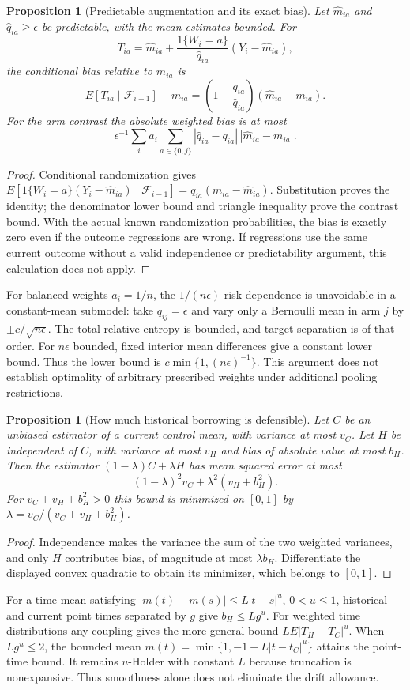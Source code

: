 \documentclass[11pt]{article}
\newtheorem{proposition}[theorem]{Proposition}
\theoremstyle{remark}
\begin{document}
\begin{proposition}[Predictable augmentation and its exact bias]
Let $\widehat m_{ia}$ and $\widehat q_{ia}\ge\epsilon$ be predictable, with the mean estimates bounded. For
\[
 T_{ia}=\widehat m_{ia}+\frac{1\{W_i=a\}}{\widehat q_{ia}}
 (Y_i-\widehat m_{ia}),
\]
the conditional bias relative to $m_{ia}$ is
\[
 E[T_{ia}\mid\mathcal F_{i-1}]-m_{ia}
 =\left(1-\frac{q_{ia}}{\widehat q_{ia}}\right)(\widehat m_{ia}-m_{ia}).
\]
For the arm contrast the absolute weighted bias is at most
\[
 \epsilon^{-1}\sum_i a_i\sum_{a\in\{0,j\}}
 |\widehat q_{ia}-q_{ia}|\,|\widehat m_{ia}-m_{ia}|.
\]
\end{proposition}
\begin{proof}
Conditional randomization gives
$E[1\{W_i=a\}(Y_i-\widehat m_{ia})\mid\mathcal F_{i-1}]
=q_{ia}(m_{ia}-\widehat m_{ia})$. Substitution proves the identity; the denominator lower bound and triangle inequality prove the contrast bound. With the actual known randomization probabilities, the bias is exactly zero even if the outcome regressions are wrong. If regressions use the same current outcome without a valid independence or predictability argument, this calculation does not apply.
\end{proof}
For balanced weights $a_i=1/n$, the $1/(n\epsilon)$ risk dependence is unavoidable in a constant-mean submodel: take $q_{ij}=\epsilon$ and vary only a Bernoulli mean in arm $j$ by $\pm c/\sqrt{n\epsilon}$. The total relative entropy is bounded, and target separation is of that order. For $n\epsilon$ bounded, fixed interior mean differences give a constant lower bound. Thus the lower bound is $c\min\{1,(n\epsilon)^{-1}\}$. This argument does not establish optimality of arbitrary prescribed weights under additional pooling restrictions.

\begin{proposition}[How much historical borrowing is defensible]
Let $C$ be an unbiased estimator of a current control mean, with variance at most $v_C$. Let $H$ be independent of $C$, with variance at most $v_H$ and bias of absolute value at most $b_H$. Then the estimator $(1-\lambda)C+\lambda H$ has mean squared error at most
\[
 (1-\lambda)^2v_C+\lambda^2(v_H+b_H^2).
\]
For $v_C+v_H+b_H^2>0$ this bound is minimized on $[0,1]$ by
$\lambda=v_C/(v_C+v_H+b_H^2)$.
\end{proposition}
\begin{proof}
Independence makes the variance the sum of the two weighted variances, and only $H$ contributes bias, of magnitude at most $\lambda b_H$. Differentiate the displayed convex quadratic to obtain its minimizer, which belongs to $[0,1]$.
\end{proof}
For a time mean satisfying $|m(t)-m(s)|\le L|t-s|^u$, $0<u\le1$, historical and current point times separated by $g$ give $b_H\le Lg^u$. For weighted time distributions any coupling gives the more general bound $L E|T_H-T_C|^u$. When $Lg^u\le2$, the bounded mean $m(t)=\min\{1,-1+L|t-t_C|^u\}$ attains the point-time bound. It remains $u$-Holder with constant $L$ because truncation is nonexpansive. Thus smoothness alone does not eliminate the drift allowance.
\end{document}
